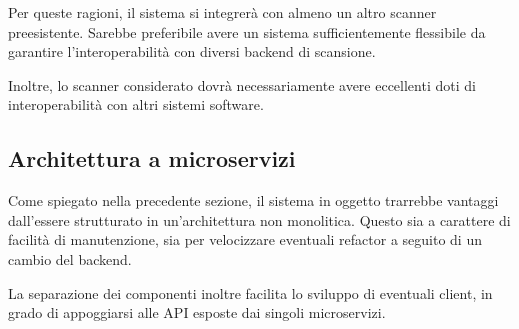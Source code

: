 Per queste ragioni, il sistema si integrerà con almeno un altro scanner preesistente. Sarebbe preferibile avere un sistema sufficientemente flessibile da garantire l'interoperabilità con diversi backend di scansione.

Inoltre, lo scanner considerato dovrà necessariamente avere eccellenti doti di interoperabilità con altri sistemi software.

\subsection{Architettura a microservizi}
\label{microservices}
Come spiegato nella precedente sezione, il sistema in oggetto trarrebbe vantaggi dall'essere strutturato in un'architettura non monolitica. Questo sia a carattere di facilità di manutenzione, sia per velocizzare eventuali refactor a seguito di un cambio del backend.

La separazione dei componenti inoltre facilita lo sviluppo di eventuali client, in grado di appoggiarsi alle API esposte dai singoli microservizi.
